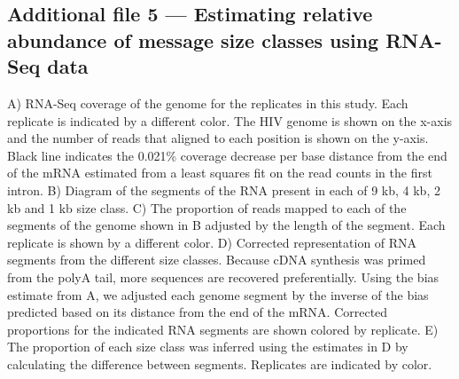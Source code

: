 \documentclass[../sherrill-Mix_thesis.tex]{subfiles}
\begin{document}
  \subsection{Additional file 5 --- Estimating relative abundance of \hivEight{} message size classes using RNA-Seq data}
		A) RNA-Seq coverage of the \hivEight{} genome for the replicates in this study. Each replicate is indicated by a different color. The HIV genome is shown on the x-axis and the number of reads that aligned to each position is shown on the y-axis. Black line indicates the 0.021\% coverage decrease per base distance from the \threePrime{} end of the mRNA estimated from a least squares fit on the read counts in the first intron.
		B) Diagram of the segments of the \hivEight{} RNA present in each of 9 kb, 4 kb, 2 kb and 1 kb size class. 
		C) The proportion of reads mapped to each of the segments of the \hivEight{} genome shown in B adjusted by the length of the segment. Each replicate is shown by a different color.
		D) Corrected representation of RNA segments from the different size classes. Because cDNA synthesis was primed from the polyA tail, more \threePrime{} sequences are recovered preferentially. Using the bias estimate from A, we adjusted each genome segment by the inverse of the bias predicted based on its distance from the \threePrime{} end of the mRNA. Corrected proportions for the indicated RNA segments are shown colored by replicate. 
		E) The proportion of each size class was inferred using the estimates in D by calculating the difference between segments. Replicates are indicated by color.
		
\end{document}
